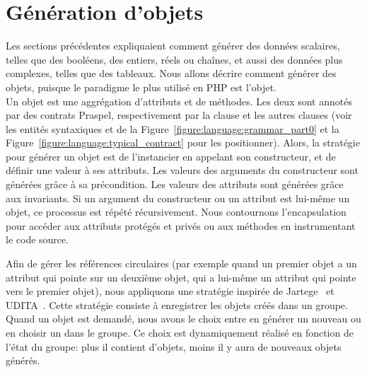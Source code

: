 \section{Génération d'objets}
\label{section:data:objects}

Les sections précédentes expliquaient comment générer des données scalaires,
telles que des booléens, des entiers, réels ou chaînes, et aussi des données
plus complexes, telles que des tableaux. Nous allons décrire comment générer des
objets, puisque le paradigme le plus utilisé en PHP est l'objet. \\

Un objet est une aggrégation d'attributs et de méthodes. Les deux sont annotés
par des contrats Praspel, respectivement par la clause \ainvariant et les autres
clauses (voir les entités syntaxiques  et
 de la Figure~\ref{figure:language:grammar_part0} et la
Figure~\ref{figure:language:typical_contract} pour les positionner). Alors, la
stratégie pour générer un objet est de l'instancier en appelant son
constructeur, et de définir une valeur à ses attributs. Les valeurs des
arguments du constructeur sont générées grâce à sa précondition. Les valeurs des
attributs sont générées grâce aux invariants. Si un argument du constructeur ou
un attribut est lui-même un objet, ce processus est répété récursivement. Nous
contournons l'encapsulation pour accéder aux attributs protégés et privés ou aux
méthodes en instrumentant le code source.

Afin de gérer les références circulaires (par exemple quand un premier objet a
un attribut qui pointe sur un deuxième objet, qui a lui-même un attribut qui
pointe vers le premier objet), nous appliquons une stratégie inspirée de
Jartege~ et UDITA~. Cette stratégie
consiste à enregistrer les objets créés dans un groupe. Quand un objet est
demandé, nous avons le choix entre en générer un nouveau ou en choisir un dans
le groupe. Ce choix est dynamiquement réalisé en fonction de l'état du groupe:
plus il contient d'objets, moins il y aura de nouveaux objets générés.
